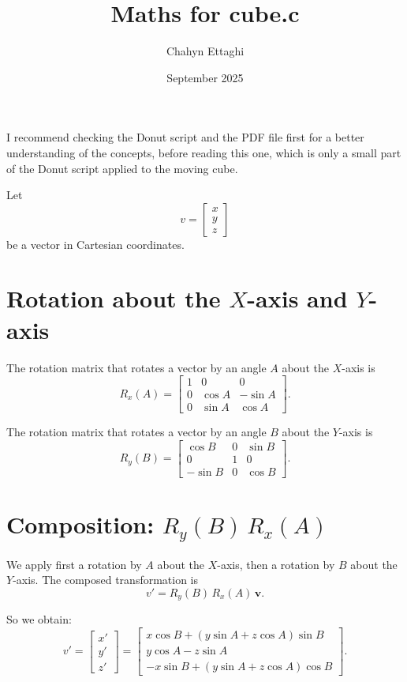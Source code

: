 \documentclass{article}
\title{Maths for cube.c}
\author{Chahyn Ettaghi}
\date{September 2025}
\begin{document}
\maketitle

I recommend checking the Donut script and the PDF file first for a better understanding of the concepts, before reading this one, which is only a small part of the Donut script applied to the moving cube.

Let
\[
v = \begin{bmatrix} x \\ y \\ z \end{bmatrix}
\]
be a vector in Cartesian coordinates.

\section*{Rotation about the $X$-axis and $Y$-axis }

The rotation matrix that rotates a vector by an angle $A$ about the $X$-axis is
\[
R_x(A) = \begin{bmatrix}
1 & 0 & 0 \\
0 & \cos A & -\sin A \\
0 & \sin A & \cos A
\end{bmatrix}.
\]

The rotation matrix that rotates a vector by an angle $B$ about the $Y$-axis is
\[
R_y(B) = \begin{bmatrix}
\cos B & 0 & \sin B \\
0 & 1 & 0 \\
-\sin B & 0 & \cos B
\end{bmatrix}.
\]

\section*{Composition: $R_y(B)\,R_x(A)$}

We apply first a rotation by $A$ about the $X$-axis, then a rotation by $B$ about the $Y$-axis. The composed transformation is
\[
v' = R_y(B)\,R_x(A)\,\bm{v}.
\]

So we obtain:
\[
v' = \begin{bmatrix} x' \\ y' \\ z' \end{bmatrix}
= \begin{bmatrix}
x\cos B + (y\sin A + z\cos A)\sin B \\
y\cos A - z\sin A \\
- x\sin B + (y\sin A + z\cos A)\cos B
\end{bmatrix}.
\]
\end{document}

